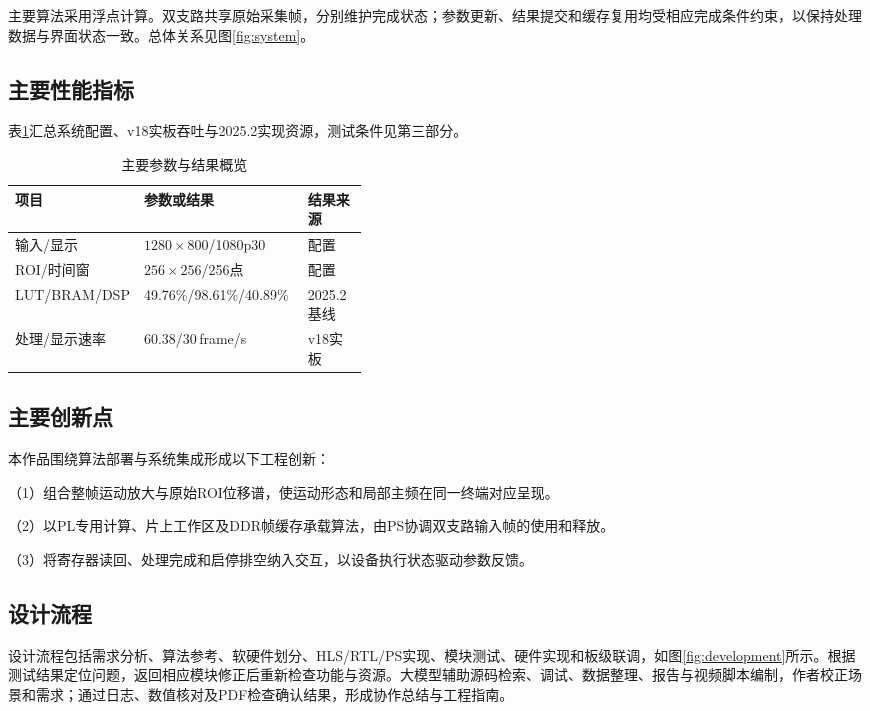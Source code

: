 \documentclass[UTF8,a4paper,zihao=-4,fontset=none]{ctexart}
\renewcommand{\small}{\fontsize{10.5pt}{13pt}\selectfont}
\numberwithin{figure}{section}
\numberwithin{table}{section}
\begin{document}
主要算法采用浮点计算。双支路共享原始采集帧，分别维护完成状态；参数更新、结果提交和缓存复用均受相应完成条件约束，以保持处理数据与界面状态一致。总体关系见图\ref{fig:system}。

\subsection{主要性能指标}
表\ref{tab:overview-metrics}汇总系统配置、v18实板吞吐与2025.2实现资源，测试条件见第三部分。

\begin{table}[htbp]
  \centering\small
  \caption{主要参数与结果概览}
  \label{tab:overview-metrics}
  \begin{tabularx}{\linewidth}{@{}p{0.24\linewidth}Xp{0.17\linewidth}@{}}
    \toprule
    项目 & 参数或结果 & 结果来源 \\
    \midrule
    输入/显示 & $1280\times800$/1080p30 & 配置 \\
    ROI/时间窗 & $256\times256$/256点 & 配置 \\
    LUT/BRAM/DSP & 49.76\%/98.61\%/40.89\% & 2025.2基线 \\
    处理/显示速率 & 60.38/30\,frame/s & v18实板 \\
    \bottomrule
  \end{tabularx}
\end{table}

\subsection{主要创新点}
本作品围绕算法部署与系统集成形成以下工程创新：

（1）组合整帧运动放大与原始ROI位移谱，使运动形态和局部主频在同一终端对应呈现。

（2）以PL专用计算、片上工作区及DDR帧缓存承载算法，由PS协调双支路输入帧的使用和释放。

（3）将寄存器读回、处理完成和启停排空纳入交互，以设备执行状态驱动参数反馈。

\subsection{设计流程}
设计流程包括需求分析、算法参考、软硬件划分、HLS/RTL/PS实现、模块测试、硬件实现和板级联调，如图\ref{fig:development}所示。根据测试结果定位问题，返回相应模块修正后重新检查功能与资源。大模型辅助源码检索、调试、数据整理、报告与视频脚本编制，作者校正场景和需求；通过日志、数值核对及PDF检查确认结果，形成协作总结与工程指南。
\end{document}
